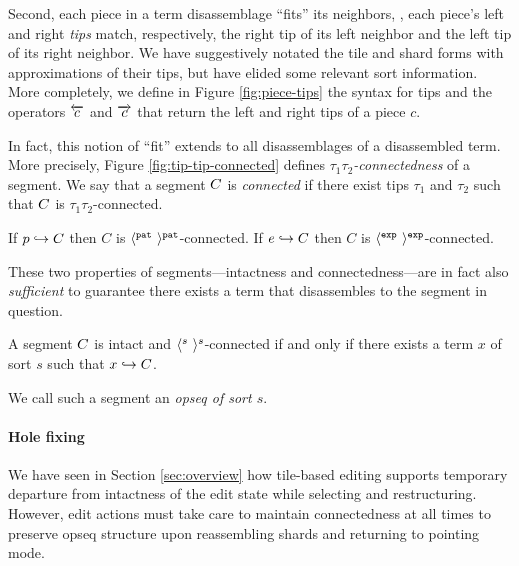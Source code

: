 Second, each piece in a term disassemblage ``fits''
its neighbors, \ie, each piece's left and right \emph{tips}
match, respectively, the right tip of its left neighbor
and the left tip of its right neighbor.
We have suggestively notated the tile and shard forms with
approximations of their tips, but have elided some relevant
sort information.
More completely, we define in Figure \ref{fig:piece-tips}
the syntax for tips and the operators $\overleftarrow{c}$
and $\overrightarrow{c}$ that return the left and right tips
of a piece $c$.

In fact, this notion of ``fit'' extends to all disassemblages
of a disassembled term. 
More precisely, Figure \ref{fig:tip-tip-connected} defines
\emph{$\tau_1\tau_2$-connectedness} of a segment.
We say that a segment $C$ is \emph{connected} if there exist
tips $\tau_1$ and $\tau_2$ such that $C$ is $\tau_1\tau_2$-connected.

\begin{lemma}
  If $p\hookrightarrow C$ then $C$ is $\langle^{\texttt{pat}}~\rangle^{\texttt{pat}}$-connected.
  If $e\hookrightarrow C$ then $C$ is $\langle^{\texttt{exp}}~\rangle^{\texttt{exp}}$-connected.
\end{lemma}




These two properties of segments---intactness
and connectedness---are in fact also \emph{sufficient} to
guarantee there exists a term that disassembles to
the segment in question.

\begin{theorem} \label{thm:term-parseability}
  A segment $C$ is intact and $\langle^{s}~\rangle^{s}$-connected
  if and only if there exists a term $x$ of sort $s$ such that
  $x\hookrightarrow C$.
\end{theorem}
\noindent
We call such a segment an \emph{opseq of sort $s$}.

\paragraph{Hole fixing}
We have seen in Section \ref{sec:overview} how tile-based
editing supports temporary departure from intactness of
the edit state while selecting and restructuring.
However, edit actions must take care to maintain
connectedness at all times to preserve opseq structure
upon reassembling shards and returning to pointing mode.

